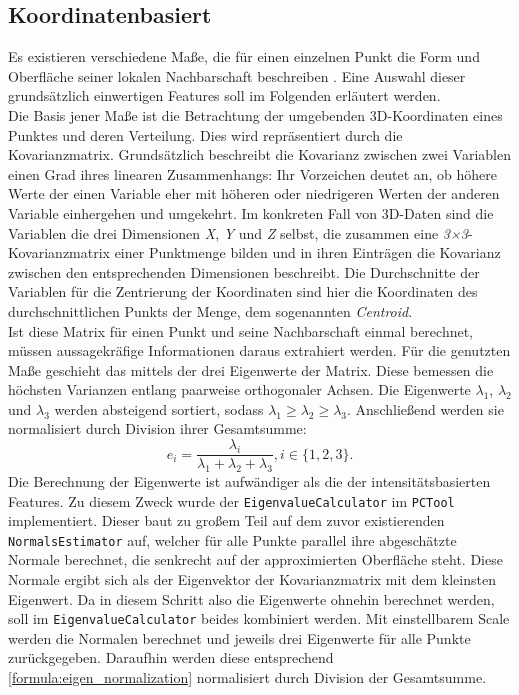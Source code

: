 \subsection*{Koordinatenbasiert}

Es existieren verschiedene Maße, die für einen einzelnen Punkt die Form und Oberfläche seiner lokalen Nachbarschaft beschreiben \citep{Han.etal-2018}. Eine Auswahl dieser grundsätzlich einwertigen Features soll im Folgenden erläutert werden. \\
Die Basis jener Maße ist die Betrachtung der umgebenden 3D-Koordinaten eines Punktes und deren Verteilung. Dies wird repräsentiert durch die Kovarianzmatrix. Grundsätzlich beschreibt die Kovarianz zwischen zwei Variablen einen Grad ihres linearen Zusammenhangs: Ihr Vorzeichen deutet an, ob höhere Werte der einen Variable eher mit höheren oder niedrigeren Werten der anderen Variable einhergehen und umgekehrt. Im konkreten Fall von 3D-Daten sind die Variablen die drei Dimensionen \textit{X}, \textit{Y} und \textit{Z} selbst, die zusammen eine \textit{3×3}-Kovarianzmatrix einer Punktmenge bilden und in ihren Einträgen die Kovarianz zwischen den entsprechenden Dimensionen beschreibt. Die Durchschnitte der Variablen für die Zentrierung der Koordinaten sind hier die Koordinaten des durchschnittlichen Punkts der Menge, dem sogenannten \textit{Centroid}. \\
Ist diese Matrix für einen Punkt und seine Nachbarschaft einmal berechnet, müssen aussagekräfige Informationen daraus extrahiert werden. Für die genutzten Maße geschieht das mittels der drei Eigenwerte der Matrix. Diese bemessen die höchsten Varianzen entlang paarweise orthogonaler Achsen. Die Eigenwerte $\lambda_1$, $\lambda_2$ und $\lambda_3$ werden absteigend sortiert, sodass $\lambda_1 \geq \lambda_2 \geq \lambda_3$. Anschließend werden sie normalisiert durch Division ihrer Gesamtsumme: 
\begin{equation}
    \label{formula:eigen_normalization}
    e_i = \frac{\lambda_i}{\lambda_1 + \lambda_2 + \lambda_3}, i \in \{1, 2, 3\}.
\end{equation}
Die Berechnung der Eigenwerte ist aufwändiger als die der intensitätsbasierten Features. Zu diesem Zweck wurde der \texttt{EigenvalueCalculator} im \texttt{PCTool} implementiert. Dieser baut zu großem Teil auf dem zuvor existierenden \texttt{NormalsEstimator} auf, welcher für alle Punkte parallel ihre abgeschätzte Normale berechnet, die senkrecht auf der approximierten Oberfläche steht. Diese Normale ergibt sich als der Eigenvektor der Kovarianzmatrix mit dem kleinsten Eigenwert. Da in diesem Schritt also die Eigenwerte ohnehin berechnet werden, soll im \texttt{EigenvalueCalculator} beides kombiniert werden. Mit einstellbarem Scale werden die Normalen berechnet und jeweils drei Eigenwerte für alle Punkte zurückgegeben. Daraufhin werden diese entsprechend \ref{formula:eigen_normalization} normalisiert durch Division der Gesamtsumme. \\\\
